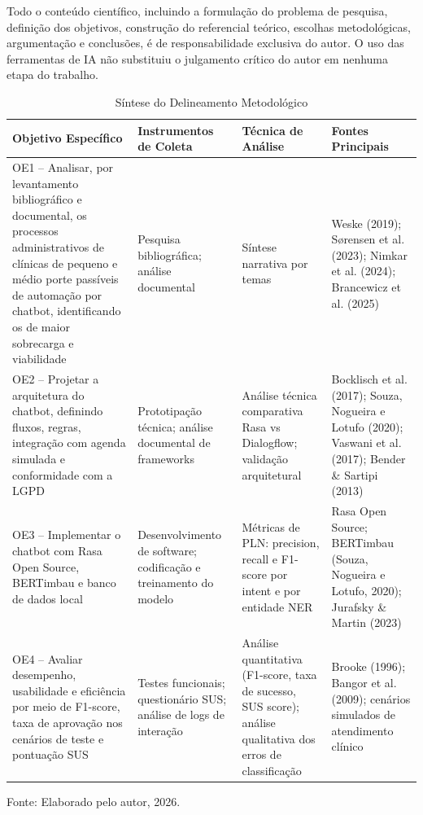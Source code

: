 \documentclass[12pt,a4paper]{extarticle}
\begin{document}
Todo o conteúdo científico, incluindo a formulação do problema de pesquisa, definição dos objetivos, construção do referencial teórico, escolhas metodológicas, argumentação e conclusões, é de responsabilidade exclusiva do autor. O uso das ferramentas de IA não substituiu o julgamento crítico do autor em nenhuma etapa do trabalho.

\begin{table}[h]
\centering
\caption{Síntese do Delineamento Metodológico}
\label{tab:delineamento}
\begin{tabular}{p{5.0cm}p{2.9cm}p{3.4cm}p{3.4cm}}
\hline
\textbf{Objetivo Específico} & \textbf{Instrumentos de Coleta} & \textbf{Técnica de Análise} & \textbf{Fontes Principais} \\
\hline
OE1 -- Analisar, por levantamento bibliográfico e documental, os processos administrativos de clínicas de pequeno e médio porte passíveis de automação por chatbot, identificando os de maior sobrecarga e viabilidade &
Pesquisa bibliográfica; análise documental &
Síntese narrativa por temas &
Weske (2019); Sørensen et al. (2023); Nimkar et al. (2024); Brancewicz et al. (2025) \\
OE2 -- Projetar a arquitetura do chatbot, definindo fluxos, regras, integração com agenda simulada e conformidade com a LGPD &
Prototipação técnica; análise documental de frameworks &
Análise técnica comparativa Rasa vs Dialogflow; validação arquitetural &
Bocklisch et al. (2017); Souza, Nogueira e Lotufo (2020); Vaswani et al. (2017); Bender \& Sartipi (2013) \\
OE3 -- Implementar o chatbot com Rasa Open Source, BERTimbau e banco de dados local &
Desenvolvimento de software; codificação e treinamento do modelo &
Métricas de PLN: precision, recall e F1-score por intent e por entidade NER &
Rasa Open Source; BERTimbau (Souza, Nogueira e Lotufo, 2020); Jurafsky \& Martin (2023) \\
OE4 -- Avaliar desempenho, usabilidade e eficiência por meio de F1-score, taxa de aprovação nos cenários de teste e pontuação SUS &
Testes funcionais; questionário SUS; análise de logs de interação &
Análise quantitativa (F1-score, taxa de sucesso, SUS score); análise qualitativa dos erros de classificação &
Brooke (1996); Bangor et al. (2009); cenários simulados de atendimento clínico \\
\hline
\end{tabular}
\vspace{0.3cm}
\footnotesize{Fonte: Elaborado pelo autor, 2026.}
\end{table}
\end{document}
